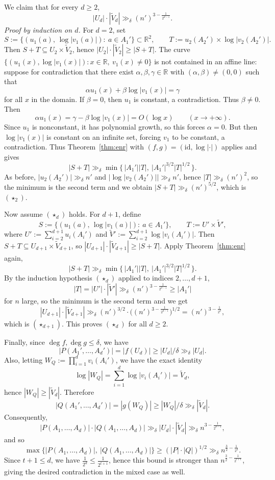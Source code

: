 \documentclass[12pt,reqno]{amsart}
\numberwithin{equation}{section}
\begin{document}
We claim that for every $d\ge2$,
\[
|U_d|\cdot|\widetilde V_d|\gg_\delta (n')^{3-\frac1{2^{d-1}}}.
\tag{$\star_d$}
\]
\emph{Proof by induction on $d$.}
For $d=2$, set
\[
S:=\{(u_1(a),\,\log|v_1(a)|):\ a\in A_1'\}\subset\mathbb R^2,
\qquad
T:=u_2(A_2')\times \log|v_2(A_2')|.
\]
Then $S+T\subseteq U_2\times \widetilde V_2$, hence $|U_2|\cdot|\widetilde V_2|\ge |S+T|$.
The curve $\{(u_1(x),\log|v_1(x)|):x\in\mathbb R,\ v_1(x)\ne0\}$ is not contained in an affine line:
suppose for contradiction that there exist $\alpha,\beta,\gamma\in\mathbb R$ with $(\alpha,\beta)\neq(0,0)$ such that
\[
\alpha u_1(x)+\beta\log|v_1(x)|=\gamma
\]
for all $x$ in the domain.
If $\beta=0$, then $u_1$ is constant, a contradiction. Thus $\beta\neq 0$.
Then
\[
\alpha u_1(x)=\gamma-\beta\log|v_1(x)|=O(\log x)\qquad(x\to+\infty).
\]
Since $u_1$ is nonconstant, it has polynomial growth, so this forces $\alpha=0$.
But then $\log|v_1(x)|$ is constant on an infinite set, forcing $v_1$ to be constant, a contradiction.
Thus Theorem~\ref{thm:enr} with $(f,g)=(\mathrm{id},\log|\cdot|)$ applies and gives
\[
|S+T|\gg_\delta \min\{\,|A_1'||T|,\ |A_1'|^{3/2}|T|^{1/2}\,\}.
\]
As before, $|u_2(A_2')|\gg_\delta n'$ and $|\log|v_2(A_2')||\gg_\delta n'$, hence $|T|\gg_\delta (n')^2$,
so the minimum is the second term and we obtain $|S+T|\gg_\delta (n')^{5/2}$, which is $(\star_2)$.

Now assume $(\star_d)$ holds. For $d+1$, define
\[
S:=\{(u_1(a),\,\log|v_1(a)|):\ a\in A_1'\},\qquad
T:=U'\times \widetilde V',
\]
where $U':=\sum_{i=2}^{d+1}u_i(A_i')$ and
$\widetilde V':=\sum_{i=2}^{d+1}\log|v_i(A_i')|$.
Then $S+T\subseteq U_{d+1}\times \widetilde V_{d+1}$, so
$|U_{d+1}|\cdot|\widetilde V_{d+1}|\ge |S+T|$.
Apply Theorem~\ref{thm:enr} again, 
\[
|S+T|\gg_\delta \min\{\,|A_1'||T|,\ |A_1'|^{3/2}|T|^{1/2}\,\}.
\]
By the induction hypothesis $(\star_d)$ applied to indices $2,\dots,d+1$,
\[
|T|=|U'|\cdot|\widetilde V'|\gg_\delta (n')^{3-\frac1{2^{d-1}}}\ge |A_1'|
\]
for $n$ large, so the minimum is the second term and we get
\[
|U_{d+1}|\cdot|\widetilde V_{d+1}|
\gg_\delta
(n')^{3/2}\cdot \Big((n')^{3-\frac1{2^{d-1}}}\Big)^{1/2}
=
(n')^{3-\frac1{2^{d}}},
\]
which is $(\star_{d+1})$. This proves $(\star_d)$ for all $d\ge2$.

\smallskip
\noindent Finally, since $\deg f,\deg g\le\delta$, we have
\[
|P(A_1',\ldots,A_d')|=|f(U_d)|\ge |U_d|/\delta\gg_\delta |U_d|.
\]
Also, letting $W_Q:=\prod_{i=1}^d v_i(A_i')$, we have the exact identity
\[
\log|W_Q|=\sum_{i=1}^d \log|v_i(A_i')|=\widetilde V_d,
\]
hence $|W_Q|\ge |\widetilde V_d|$.
Therefore
\[
|Q(A_1',\ldots,A_d')|=|g(W_Q)|\ge |W_Q|/\delta \gg_\delta |\widetilde V_d|.
\]
Consequently,
\[
|P(A_1,\ldots,A_d)|\cdot |Q(A_1,\ldots,A_d)|
\gg_\delta
|U_d|\cdot|\widetilde V_d|
\gg_\delta
n^{3-\frac1{2^{d-1}}},
\]
and so
\[
\max\{|P(A_1,\ldots,A_d)|,\ |Q(A_1,\ldots,A_d)|\}
\ge (|P|\cdot |Q|)^{1/2}
\gg_\delta
n^{\frac32-\frac1{2^{d}}}.
\]
Since $t+1\le d$, we have $\frac1{2^{d}}\le \frac1{2^{t+1}}$, hence this bound is stronger than
$n^{\frac32-\frac1{2^{t+1}}}$, giving the desired contradiction in the mixed case as well.








\end{document}
